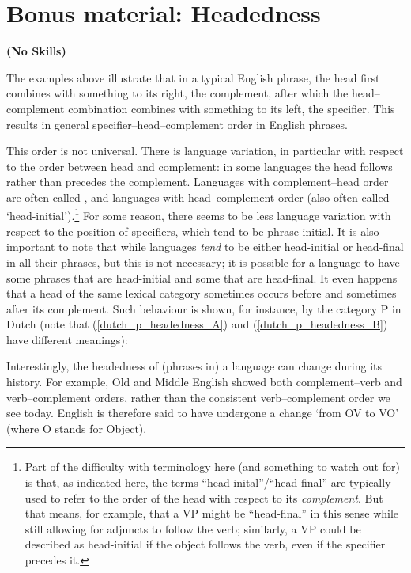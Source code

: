 \documentclass{article}
\begin{document}
\section*{Bonus material: Headedness}
\hfill{}\textbf{(No Skills)}

The examples above illustrate that in a typical English phrase, the head first combines with something to its right, the complement, after which the head--complement combination combines with something to its left, the specifier.
This results in general specifier--head--complement order in English phrases.

This order is not universal.
There is language variation, in particular with respect to the order between head and complement: in some languages the head follows rather than precedes the complement.
Languages with complement--head order are often called , and languages with head--complement order  (also often called `head-initial').\footnote{Part of the difficulty with terminology here (and something to watch out for) is that, as indicated here, the terms ``head-inital''/``head-final'' are typically used to refer  to the order of the head with respect to its \emph{complement}.
But that means, for example, that a VP might be ``head-final'' in this sense while still allowing for adjuncts to follow the verb; similarly, a VP could be described as head-initial if the object follows the verb, even if the specifier precedes it.}
For some reason, there seems to be less language variation with respect to the position of specifiers, which tend to be phrase-initial.
It is also important to note that while languages \emph{tend} to be either head-initial or head-final in all their phrases, but this is not necessary; it is possible for a language to have some phrases that are head-initial and some that are head-final.
It even happens that a head of the same lexical category sometimes occurs before and sometimes after its complement. Such behaviour is shown, for instance, by the category P in Dutch (note that (\ref{dutch_p_headedness_A}) and (\ref{dutch_p_headedness_B}) have different meanings):
\begin{exe}
\end{exe}
Interestingly, the headedness of (phrases in) a language can change during its history.
For example, Old and Middle English showed both complement--verb and verb--complement orders, rather than the consistent verb--complement order we see today.
English is therefore said to have undergone a change `from OV to VO' (where O stands for Object). 

\end{document}
